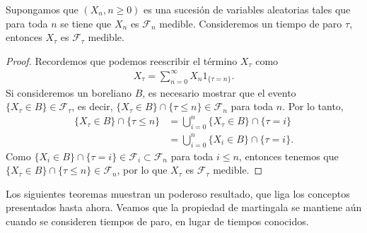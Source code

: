 \begin{proposition}
\label{medible}
	Supongamos que $(X_n, n \geq 0)$ es una sucesión de variables aleatorias tales que para toda $n$ se tiene que $X_n$ es $\mathcal{F}_n$ medible. Consideremos un tiempo de paro $\tau$, entonces $X_{\tau}$ es $\mathcal{F}_{\tau}$ medible.
\end{proposition}
\begin{proof}
	Recordemos que podemos reescribir el término $X_{\tau}$ como
	\begin{align*}
		X_{\tau} = \sum_{n=0}^{\infty} X_n  1_{ \{\tau = n\} }.
	\end{align*}
	Si consideremos un boreliano $B$, es necesario mostrar que el evento $\{ X_{\tau} \in B \} \in \mathcal{F}_{\tau}$, es decir, $\{ X_{\tau} \in B \} \cap \{ \tau \leq n\} \in \mathcal{F}_{n}$ para toda $n$. Por lo tanto,
	\begin{align*}
		\{ X_{\tau} \in B \} \cap \{ \tau \leq n\} & = \bigcup_{i=0}^{n} \{ X_{\tau} \in B \} \cap \{ \tau = i\} \\
		& = \bigcup_{i=0}^{n} \{ X_{i} \in B \} \cap \{ \tau = i\}.
	\end{align*}
	Como $\{ X_{i} \in B \} \cap \{ \tau = i\} \in \mathcal{F}_i \subset \mathcal{F}_n$ para toda $i \leq n$, entonces tenemos que $\{ X_{\tau} \in B \} \cap \{ \tau \leq n\} \in \mathcal{F}_{n}$, por lo que $X_{\tau}$ es $\mathcal{F}_{\tau}$ medible.
\end{proof}

Los siguientes teoremas muestran un poderoso resultado, que liga los conceptos presentados hasta ahora. Veamos que la propiedad de martingala se mantiene aún cuando se consideren tiempos de paro, en lugar de tiempos conocidos.

